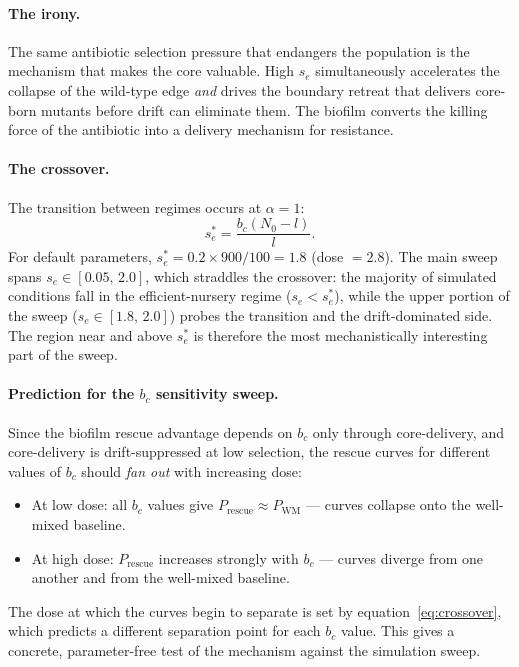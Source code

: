 \documentclass[12pt]{article}
\newcommand{\Nzero}{N_0}
\newcommand{\sEdge}{s_e}
\newcommand{\bCore}{b_c}
\begin{document}
\paragraph{The irony.}
The same antibiotic selection pressure that endangers the population is
the mechanism that makes the core valuable. High $\sEdge$ simultaneously
accelerates the collapse of the wild-type edge \emph{and} drives the
boundary retreat that delivers core-born mutants before drift can
eliminate them. The biofilm converts the killing force of the antibiotic
into a delivery mechanism for resistance.

\paragraph{The crossover.}
The transition between regimes occurs at $\alpha = 1$:
\begin{equation}
    \sEdge^{*} = \frac{\bCore(\Nzero - l)}{l}.
    \label{eq:crossover}
\end{equation}
For default parameters, $\sEdge^{*} = 0.2 \times 900 / 100 = 1.8$
(dose $= 2.8$). The main sweep spans $\sEdge \in [0.05,\, 2.0]$, which
straddles the crossover: the majority of simulated conditions fall in the
efficient-nursery regime ($\sEdge < \sEdge^{*}$), while the upper portion
of the sweep ($\sEdge \in [1.8,\, 2.0]$) probes the transition and the
drift-dominated side. The region near and above $\sEdge^{*}$ is therefore
the most mechanistically interesting part of the sweep.

\paragraph{Prediction for the $\bCore$ sensitivity sweep.}
Since the biofilm rescue advantage depends on $\bCore$ only through
core-delivery, and core-delivery is drift-suppressed at low selection,
the rescue curves for different values of $\bCore$ should \emph{fan out}
with increasing dose:
\begin{itemize}
    \item At low dose: all $\bCore$ values give
        $P_{\text{rescue}} \approx P_{\text{WM}}$ --- curves collapse
        onto the well-mixed baseline.
    \item At high dose: $P_{\text{rescue}}$ increases strongly with
        $\bCore$ --- curves diverge from one another and from the
        well-mixed baseline.
\end{itemize}
The dose at which the curves begin to separate is set by
equation~\eqref{eq:crossover}, which predicts a different separation
point for each $\bCore$ value. This gives a concrete, parameter-free
test of the mechanism against the simulation sweep.
\end{document}
